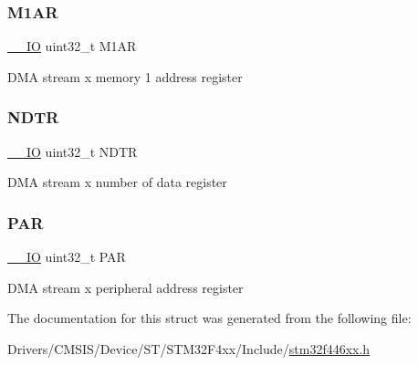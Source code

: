\subsubsection{\texorpdfstring{M1\+AR}{M1AR}}
{\footnotesize\ttfamily \mbox{\hyperlink{core__sc300_8h_aec43007d9998a0a0e01faede4133d6be}{\+\_\+\+\_\+\+IO}} uint32\+\_\+t M1\+AR}

D\+MA stream x memory 1 address register \mbox{\label{struct_d_m_a___stream___type_def_af60258ad5a25addc1e8969665d0c1731}} 
\subsubsection{\texorpdfstring{N\+D\+TR}{NDTR}}
{\footnotesize\ttfamily \mbox{\hyperlink{core__sc300_8h_aec43007d9998a0a0e01faede4133d6be}{\+\_\+\+\_\+\+IO}} uint32\+\_\+t N\+D\+TR}

D\+MA stream x number of data register \mbox{\label{struct_d_m_a___stream___type_def_aef55be3d948c22dd32a97e8d4f8761fd}} 
\subsubsection{\texorpdfstring{P\+AR}{PAR}}
{\footnotesize\ttfamily \mbox{\hyperlink{core__sc300_8h_aec43007d9998a0a0e01faede4133d6be}{\+\_\+\+\_\+\+IO}} uint32\+\_\+t P\+AR}

D\+MA stream x peripheral address register 

The documentation for this struct was generated from the following file\+:\begin{DoxyCompactItemize}
\item 
Drivers/\+C\+M\+S\+I\+S/\+Device/\+S\+T/\+S\+T\+M32\+F4xx/\+Include/\mbox{\hyperlink{stm32f446xx_8h}{stm32f446xx.\+h}}\end{DoxyCompactItemize}

